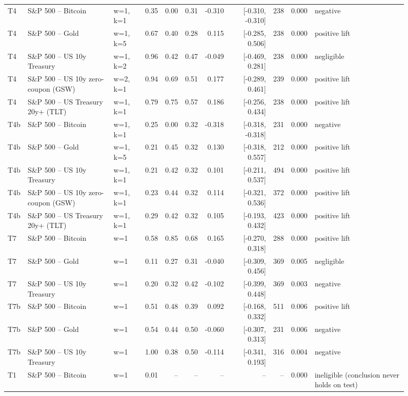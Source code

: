 \begin{figure}
\begin{tabular}{lllrrrrrrrl}
T4 & S\&P 500 -- Bitcoin & w=1, k=1 & 0.35 & 0.00 & 0.31 & -0.310 & [-0.310, -0.310] & 238 & 0.000 & negative \\
T4 & S\&P 500 -- Gold & w=1, k=5 & 0.67 & 0.40 & 0.28 & 0.115 & [-0.285, 0.506] & 238 & 0.000 & positive lift \\
T4 & S\&P 500 -- US 10y Treasury & w=1, k=2 & 0.96 & 0.42 & 0.47 & -0.049 & [-0.469, 0.281] & 238 & 0.000 & negligible \\
T4 & S\&P 500 -- US 10y zero-coupon (GSW) & w=2, k=1 & 0.94 & 0.69 & 0.51 & 0.177 & [-0.289, 0.461] & 239 & 0.000 & positive lift \\
T4 & S\&P 500 -- US Treasury 20y+ (TLT) & w=1, k=1 & 0.79 & 0.75 & 0.57 & 0.186 & [-0.256, 0.434] & 238 & 0.000 & positive lift \\
T4b & S\&P 500 -- Bitcoin & w=1, k=1 & 0.25 & 0.00 & 0.32 & -0.318 & [-0.318, -0.318] & 231 & 0.000 & negative \\
T4b & S\&P 500 -- Gold & w=1, k=5 & 0.21 & 0.45 & 0.32 & 0.130 & [-0.318, 0.557] & 212 & 0.000 & positive lift \\
T4b & S\&P 500 -- US 10y Treasury & w=1, k=1 & 0.21 & 0.42 & 0.32 & 0.101 & [-0.211, 0.537] & 494 & 0.000 & positive lift \\
T4b & S\&P 500 -- US 10y zero-coupon (GSW) & w=1, k=1 & 0.23 & 0.44 & 0.32 & 0.114 & [-0.321, 0.536] & 372 & 0.000 & positive lift \\
T4b & S\&P 500 -- US Treasury 20y+ (TLT) & w=1, k=1 & 0.29 & 0.42 & 0.32 & 0.105 & [-0.193, 0.432] & 423 & 0.000 & positive lift \\
T7 & S\&P 500 -- Bitcoin & w=1 & 0.58 & 0.85 & 0.68 & 0.165 & [-0.270, 0.318] & 288 & 0.000 & positive lift \\
T7 & S\&P 500 -- Gold & w=1 & 0.11 & 0.27 & 0.31 & -0.040 & [-0.309, 0.456] & 369 & 0.005 & negligible \\
T7 & S\&P 500 -- US 10y Treasury & w=1 & 0.20 & 0.32 & 0.42 & -0.102 & [-0.399, 0.448] & 369 & 0.003 & negative \\
T7b & S\&P 500 -- Bitcoin & w=1 & 0.51 & 0.48 & 0.39 & 0.092 & [-0.168, 0.332] & 511 & 0.006 & positive lift \\
T7b & S\&P 500 -- Gold & w=1 & 0.54 & 0.44 & 0.50 & -0.060 & [-0.307, 0.313] & 231 & 0.006 & negative \\
T7b & S\&P 500 -- US 10y Treasury & w=1 & 1.00 & 0.38 & 0.50 & -0.114 & [-0.341, 0.193] & 316 & 0.004 & negative \\
T1 & S\&P 500 -- Bitcoin & w=1 & 0.01 & -- & -- & -- & -- & -- & 0.000 & ineligible (conclusion never holds on test) \\

\end{tabular}
\end{figure}
